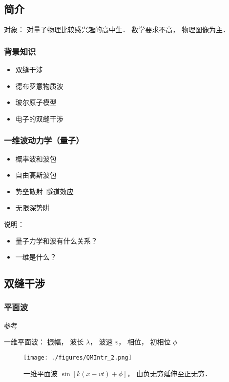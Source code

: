 
\subsection{简介}
对象： 对量子物理比较感兴趣的高中生． 数学要求不高， 物理图像为主．

\subsubsection{背景知识}
\begin{itemize}
\item 双缝干涉
\item 德布罗意物质波
\item 玻尔原子模型
\item 电子的双缝干涉
\end{itemize}

\subsubsection{一维波动力学（量子）}
\begin{itemize}
\item 概率波和波包
\item 自由高斯波包
\item 势垒散射\ 隧道效应
\item 无限深势阱
\end{itemize}

说明：
\begin{itemize}
\item 量子力学和波有什么关系？
\item 一维是什么？
\end{itemize}

\subsection{双缝干涉}

\subsubsection{平面波}

参考

一维平面波： 振幅， 波长 $\lambda$， 波速 $v$， 相位， 初相位 $\phi$
\begin{figure}[ht]
\centering
\texttt{[image: ./figures/QMIntr\_2.png]}
\caption{一维平面波 $\sin[k(x-vt) + \phi]$， 由负无穷延伸至正无穷．} \label{QMIntr_fig2}
\end{figure}


